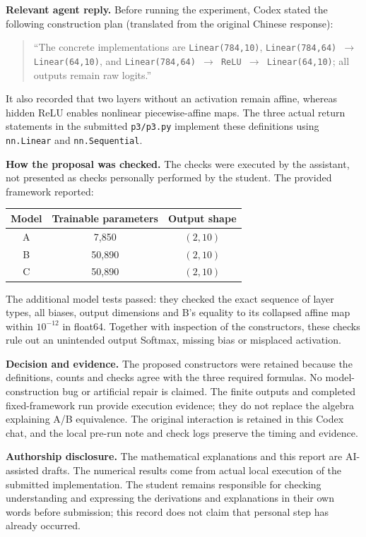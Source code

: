 \documentclass[11pt,a4paper]{article}
\begin{document}
\textbf{Relevant agent reply.} Before running the experiment, Codex stated the following construction plan (translated from the original Chinese response):
\begin{quote}
\small\raggedright
\textquotedblleft The concrete implementations are \texttt{Linear(784,10)}, \texttt{Linear(784,64) $\to$ Linear(64,10)}, and \texttt{Linear(784,64) $\to$ ReLU $\to$ Linear(64,10)}; all outputs remain raw logits.\textquotedblright
\end{quote}
It also recorded that two layers without an activation remain affine, whereas hidden ReLU enables nonlinear piecewise-affine maps. The three actual return statements in the submitted \texttt{p3/p3.py} implement these definitions using \texttt{nn.Linear} and \texttt{nn.Sequential}.

\textbf{How the proposal was checked.} The checks were executed by the assistant, not presented as checks personally performed by the student. The provided framework reported:
\begin{center}
\begin{tabular}{ccc}
\toprule
Model & Trainable parameters & Output shape\\
\midrule
A & 7,850 & $(2,10)$\\
B & 50,890 & $(2,10)$\\
C & 50,890 & $(2,10)$\\
\bottomrule
\end{tabular}
\end{center}
The additional model tests passed: they checked the exact sequence of layer types, all biases, output dimensions and B's equality to its collapsed affine map within $10^{-12}$ in float64. Together with inspection of the constructors, these checks rule out an unintended output Softmax, missing bias or misplaced activation.

\textbf{Decision and evidence.} The proposed constructors were retained because the definitions, counts and checks agree with the three required formulas. No model-construction bug or artificial repair is claimed. The finite outputs and completed fixed-framework run provide execution evidence; they do not replace the algebra explaining A/B equivalence. The original interaction is retained in this Codex chat, and the local pre-run note and check logs preserve the timing and evidence.

\textbf{Authorship disclosure.} The mathematical explanations and this report are AI-assisted drafts. The numerical results come from actual local execution of the submitted implementation. The student remains responsible for checking understanding and expressing the derivations and explanations in their own words before submission; this record does not claim that personal step has already occurred.
\end{document}
